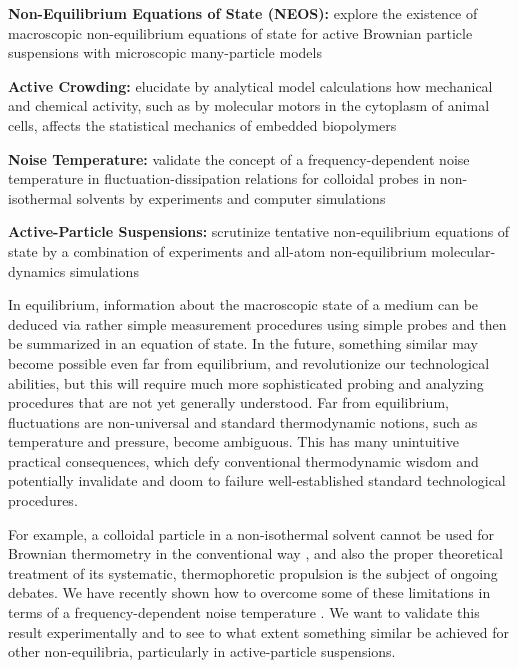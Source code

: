 \begin{workpackage}[id=WPactive,wphases=0-48,
  short=Active Particle Suspensions,%
  title=Probing Active Particle Suspensions with Colloids and Polymers,
  lead=Leipzig,
  LeipzigRM=96,PadovaRM=6,USTUTTRM=2]

\newrefsection

\begin{wpobjectives}
  \begin{compactitem}
  \item \textbf{Non-Equilibrium Equations of State (NEOS):} explore the existence of
  macroscopic non-equilibrium equations of state for active Brownian particle suspensions
  with microscopic many-particle models
  \item \textbf{Active Crowding:} elucidate by analytical model calculations how mechanical
  and chemical activity, such as by molecular motors in the cytoplasm of animal cells,
  affects the statistical mechanics of embedded biopolymers
  \item \textbf{Noise Temperature:} validate the concept of a frequency-dependent noise
  temperature in fluctuation-dissipation relations for colloidal probes 
  in non-isothermal solvents by experiments and computer simulations
  \item \textbf{Active-Particle Suspensions:} scrutinize tentative non-equilibrium equations
  of state by a combination of experiments and all-atom non-equilibrium molecular-dynamics
  simulations
  \end{compactitem}
\end{wpobjectives}

\begin{wpdescription}
In equilibrium, information about the macroscopic state of a medium can be deduced via
rather simple measurement procedures using simple probes and then be summarized in an
equation of state.
%
In the future, something similar may become possible even far from equilibrium, and
revolutionize our technological abilities, but this will require much more sophisticated
probing and analyzing procedures that are not yet generally understood.
%
Far from equilibrium, fluctuations are non-universal and standard thermodynamic notions,
such as temperature and pressure, become ambiguous.
%
This has many unintuitive practical consequences, which defy conventional thermodynamic
wisdom and potentially invalidate and doom to failure well-established standard
technological procedures.

For example, a colloidal particle in a non-isothermal solvent cannot be used for Brownian thermometry 
in the conventional way \cite{rings-etal:2010,kroy:2014}, and also the proper theoretical 
treatment of its systematic, thermophoretic propulsion is the subject of ongoing debates.
%
We have recently shown how to overcome some of these limitations in terms of a frequency-dependent noise 
temperature \cite{falasco-etal:2014}.
%
We want to validate this result experimentally and to see to what extent something similar be achieved for other 
non-equilibria, particularly in active-particle suspensions.


\end{wpdescription}
\end{workpackage}
